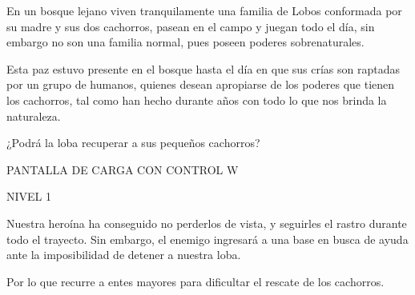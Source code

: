 \documentclass{article}
\begin{document}
En un bosque lejano viven tranquilamente una familia de Lobos conformada por su madre y sus dos cachorros, pasean en el campo y juegan todo el día, sin embargo no son una familia normal, pues poseen poderes sobrenaturales.

Esta paz estuvo presente en el bosque hasta el día en que sus crías son raptadas por un grupo de humanos, quienes desean apropiarse de los poderes que tienen los cachorros, tal como han hecho durante años con todo lo que nos brinda la naturaleza.

¿Podrá la loba recuperar a sus pequeños cachorros?

PANTALLA DE CARGA CON CONTROL W

NIVEL 1

Nuestra heroína ha conseguido no perderlos de vista, y seguirles el rastro durante todo el trayecto. Sin embargo, el enemigo ingresará a una base en busca de ayuda ante la imposibilidad de detener a nuestra loba.

Por lo que recurre a entes mayores para dificultar el rescate de los cachorros.
\end{document}
